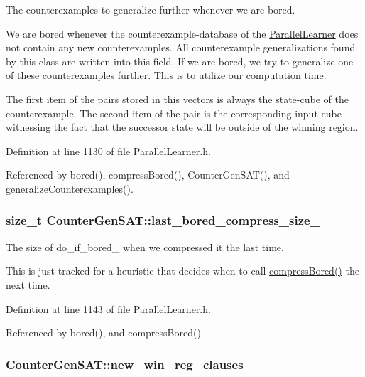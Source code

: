 The counterexamples to generalize further whenever we are bored. 

We are bored whenever the counterexample-\/database of the \hyperlink{classParallelLearner}{Parallel\-Learner} does not contain any new counterexamples. All counterexample generalizations found by this class are written into this field. If we are bored, we try to generalize one of these counterexamples further. This is to utilize our computation time.

The first item of the pairs stored in this vectors is always the state-\/cube of the counterexample. The second item of the pair is the corresponding input-\/cube witnessing the fact that the successor state will be outside of the winning region. 

Definition at line 1130 of file Parallel\-Learner.\-h.



Referenced by bored(), compress\-Bored(), Counter\-Gen\-S\-A\-T(), and generalize\-Counterexamples().

\hypertarget{classCounterGenSAT_ae3befc2cd3c74b65e055f7d29dcc9c05}{
\subsubsection[{last\-\_\-bored\-\_\-compress\-\_\-size\-\_\-}]{\setlength{\rightskip}{0pt plus 5cm}size\-\_\-t Counter\-Gen\-S\-A\-T\-::last\-\_\-bored\-\_\-compress\-\_\-size\-\_\-\hspace{0.3cm}{\ttfamily [protected]}}}\label{classCounterGenSAT_ae3befc2cd3c74b65e055f7d29dcc9c05}


The size of do\-\_\-if\-\_\-bored\-\_\- when we compressed it the last time. 

This is just tracked for a heuristic that decides when to call \hyperlink{classCounterGenSAT_ae696c35988d55e29d5a54b3c71547c12}{compress\-Bored()} the next time. 

Definition at line 1143 of file Parallel\-Learner.\-h.



Referenced by bored(), and compress\-Bored().

\hypertarget{classCounterGenSAT_a5a379bda175a32e3d4ccc0771fde024d}{
\subsubsection[{new\-\_\-win\-\_\-reg\-\_\-clauses\-\_\-}]{ Counter\-Gen\-S\-A\-T\-::new\-\_\-win\-\_\-reg\-\_\-clauses\-\_\-\hspace{0.3cm}{\ttfamily [protected]}}}\label{classCounterGenSAT_a5a379bda175a32e3d4ccc0771fde024d}


